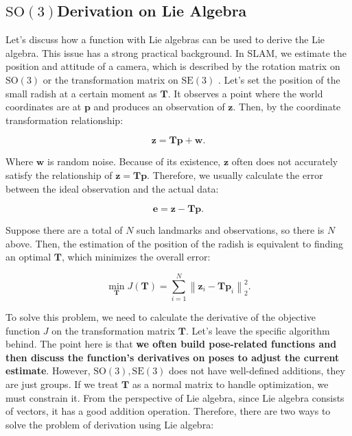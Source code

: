\enlargethispage{9pt}
\subsection{$\mathrm{SO}(3)$Derivation on Lie Algebra}

Let's discuss how a function with Lie algebras can be used to derive the Lie algebra. This issue has a strong practical background. In SLAM, we estimate the position and attitude of a camera, which is described by the rotation matrix on $\mathrm{SO}(3)$ or the transformation matrix on $\mathrm{SE}(3)$ . Let's set the position of the small radish at a certain moment as $\bm{T}$. It observes a point where the world coordinates are at $\bm{p}$ and produces an observation of $\bm{z}$. Then, by the coordinate transformation relationship:

\begin{equation}
\bm{z} = \bm{T} \bm{p} + \bm{w}.
\end{equation}

Where $\bm{w}$ is random noise. Because of its existence, $\bm{z}$ often does not accurately satisfy the relationship of $\bm{z} = \bm{T} \bm{p}$. Therefore, we usually calculate the error between the ideal observation and the actual data:

\begin{equation}
\bm{e} = \bm{z} - \bm{T} \bm{p}.
\end{equation}

Suppose there are a total of $N$ such landmarks and observations, so there is $N$ above. Then, the estimation of the position of the radish is equivalent to finding an optimal $\bm{T}$, which minimizes the overall error:

\begin{equation}
\mathop {\min }\limits_{\bm{T}} J(\bm{T} ) = \sum_{i=1}^{N} \left\| {\bm{z}_i - \bm{Tp}_i} \right\|^2_2.
\end{equation}

To solve this problem, we need to calculate the derivative of the objective function $J$ on the transformation matrix $\bm{T}$. Let's leave the specific algorithm behind. The point here is that \textbf{we often build pose-related functions and then discuss the function's derivatives on poses to adjust the current estimate}. However, $\mathrm{SO}(3), \mathrm{SE}(3)$ does not have well-defined additions, they are just groups. If we treat $\bm{T}$ as a normal matrix to handle optimization, we must constrain it. From the perspective of Lie algebra, since Lie algebra consists of vectors, it has a good addition operation. Therefore, there are two ways to solve the problem of derivation using Lie algebra:

